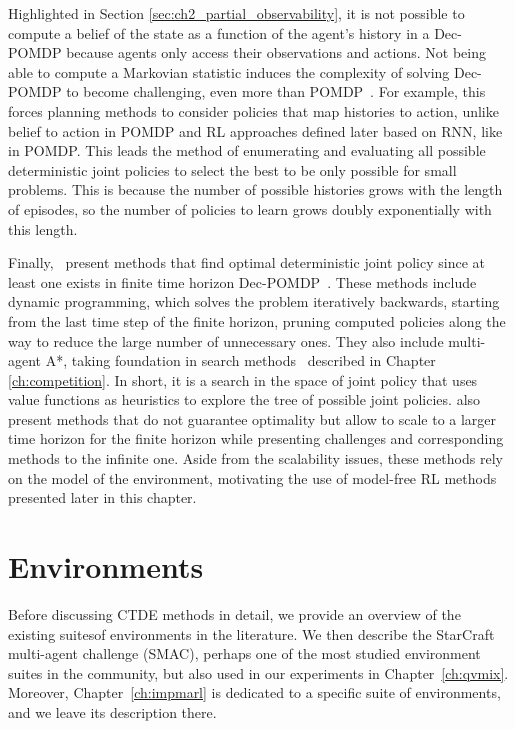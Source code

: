 Highlighted in Section \ref{sec:ch2_partial_observability}, it is not possible to compute a belief of the state as a function of the agent's history in a Dec-POMDP because agents only access their observations and actions.
Not being able to compute a Markovian statistic induces the complexity of solving Dec-POMDP to become challenging, even more than POMDP~\citep{DecPomdp}.
For example, this forces planning methods to consider policies that map histories to action, unlike belief to action in POMDP and RL approaches defined later based on RNN, like in POMDP.
This leads the method of enumerating and evaluating all possible deterministic joint policies to select the best to be only possible for small problems.
This is because the number of possible histories grows with the length of episodes, so the number of policies to learn grows doubly exponentially with this length.

Finally,~\cite{DecPomdp} present methods that find optimal deterministic joint policy since at least one exists in finite time horizon Dec-POMDP~\citep{oliehoek2008optimal}.
These methods include dynamic programming, which solves the problem iteratively backwards, starting from the last time step of the finite horizon, pruning computed policies along the way to reduce the large number of unnecessary ones.
They also include multi-agent A*, taking foundation in search methods~\citep{russel2010} described in Chapter \ref{ch:competition}.
In short, it is a search in the space of joint policy that uses value functions as heuristics to explore the tree of possible joint policies.
\cite{DecPomdp} also present methods that do not guarantee optimality but allow to scale to a larger time horizon for the finite horizon while presenting challenges and corresponding methods to the infinite one.
Aside from the scalability issues, these methods rely on the model of the environment, motivating the use of model-free RL methods presented later in this chapter.

\section{Environments}
\label{sec:ch3_env}
Before discussing CTDE methods in detail, we provide an overview of the existing suites\footnotemark of environments in the literature.
We then describe the StarCraft multi-agent challenge (SMAC), perhaps one of the most studied environment suites in the community, but also used in our experiments in Chapter~\ref{ch:qvmix}.
Moreover, Chapter~\ref{ch:impmarl} is dedicated to a specific suite of environments, and we leave its description there.

